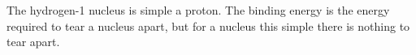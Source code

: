 The hydrogen-1 nucleus is simple a proton. The binding energy
is the energy required to tear a nucleus apart, but for a nucleus this simple there is
nothing to tear apart.



